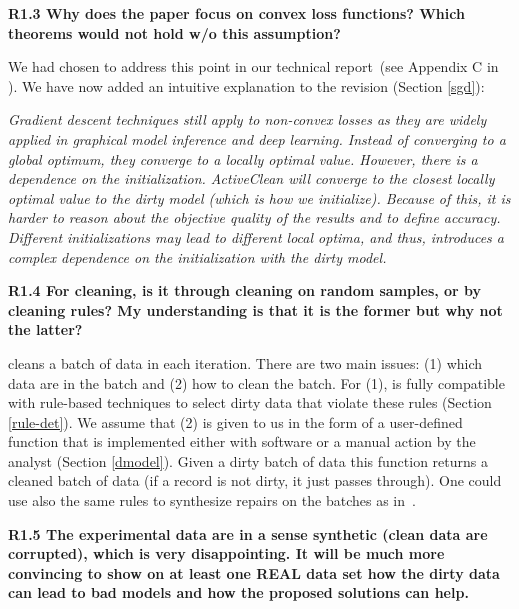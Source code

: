 \vspace{0.5em}

\noindent\textbf{R1.3 Why does the paper focus on convex loss functions? Which theorems would not hold w/o this assumption?}

\noindent We had chosen to address this point in our technical report~(see Appendix C in \cite{activecleanarxiv}). We have now added an intuitive explanation to the revision (Section \ref{sgd}):

\emph{Gradient descent techniques still apply to non-convex losses as they are widely applied in graphical model inference and deep learning. Instead of converging to a global optimum,
they converge to a locally optimal value. However, there is a dependence on the initialization.
ActiveClean will converge to the closest locally optimal value to
the dirty model (which is how we initialize). Because of this, it is harder to reason about
the objective quality of the results and to define accuracy.
 Different initializations may lead to different local
optima, and thus, introduces a complex dependence on the
initialization with the dirty model.}

\vspace{0.5em}

\noindent\textbf{R1.4 For cleaning, is it through cleaning on random samples, or by cleaning rules? My understanding is that it is the former but why not the latter?}

\noindent \sys cleans a batch of data in each iteration. 
There are two main issues: (1) which data are in the batch and (2) how to clean the batch. 
For (1), \sys is fully compatible with rule-based techniques to select dirty data that violate these rules (Section \ref{rule-det}).
We assume that (2) is given to us in the form of a user-defined function that is implemented either with software or a manual action by the analyst (Section \ref{dmodel}). 
Given a dirty batch of data this function returns a cleaned batch of data (if a record is not dirty, it just passes through).
One could use also the same rules to synthesize repairs on the batches as in~\cite{DBLP:journals/pvldb/YakoutENOI11}.

\vspace{0.5em}

\noindent\textbf{R1.5 The experimental data are in a sense synthetic (clean data are corrupted), which is very disappointing. It will be much more convincing to show on at least one REAL data set how the dirty data can lead to bad models and how the proposed solutions can help.}


